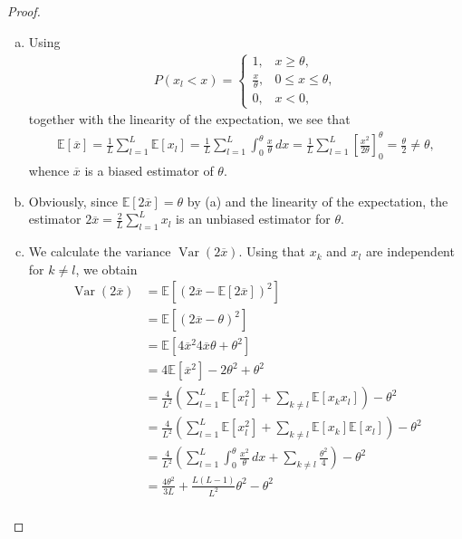\documentclass[a4paper, reqno]{amsart}
\newcommand{\E}{\mathbb E}
\theoremstyle{definition}
\numberwithin{equation}{section}
\begin{document}
\begin{proof}\
	\begin{enumerate}
	[(a)]
		\item
			Using
			\begin{align*}
				P(x_l < x) = \begin{cases} 
								1, 					& x \geq \theta, \\
								\frac{x}{\theta}, 	& 0 \leq x \leq \theta, \\ 
								0, 					& x < 0, 
							\end{cases}
			\end{align*}
			together with the linearity of the expectation, we see that
				\begin{align*}
					\E[\overline x]
						 = \frac{1}{L}\sum_{l=1}^L \E[x_l] 
						 = \frac{1}{L}\sum_{l=1}^L \int_0^\theta \frac{x}{\theta} \, dx 
						 = \frac{1}{L}\sum_{l=1}^L \left[ \frac{x^2}{2\theta} \right]^\theta_0 
						 = \frac{\theta}{2} \not= \theta,
				\end{align*}
				whence $\overline x$ is a biased estimator of $\theta.$
			\item Obviously, since $\E[2\overline x] = \theta$ by (a) and the linearity of the expectation, 
				the estimator $2\overline x = \frac{2}{L}\sum_{l=1}^L x_l$ is an unbiased estimator for $\theta.$
			\item We calculate the variance $\operatorname{Var}(2\overline x)$. Using that $x_k$ and $x_l$ are independent for $k\not= l$, we obtain
				\begin{align*}
					\operatorname{Var}(2\overline x)
						& = \E \left[ (2\overline x - \E[2\overline x])^2 \right] \\
						& = \E \left[ (2\overline x - \theta)^2 \right] \\
						& = \E \left[ 4\overline x^2 4 \overline x \theta + \theta^2 \right] \\
						& = 4 \E [\overline x^2] - 2\theta^2 + \theta^2 \\
						& = \frac{4}{L^2} \left( \sum_{l=1}^L \E[x_l^2] + \sum_{k\not=l} \E[x_k x_l] \right) - \theta^2 \\
						& = \frac{4}{L^2} \left( \sum_{l=1}^L \E[x_l^2] + \sum_{k\not=l} \E[x_k] \E [x_l] \right) - \theta^2 \\
						& = \frac{4}{L^2} \left( \sum_{l=1}^L \int_0^\theta \frac{x^2}{\theta}\, dx + \sum_{k\not= l} \frac{\theta^2}{4} \right) - \theta^2 \\
						& = \frac{4\theta^2}{3L} + \frac{L(L-1)}{L^2}\theta^2 - \theta^2 \\

\end{align*}
\end{enumerate}
\end{proof}
\end{document}
